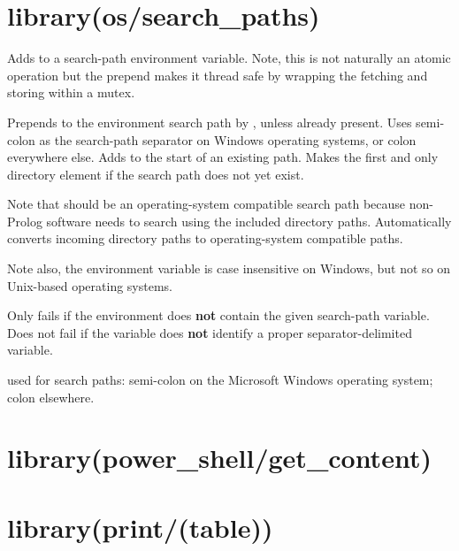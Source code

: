 \chapter{library(os/search_paths)}\label{sec:searchpaths}

\begin{description}
Adds  to a search-path environment variable. Note, this is
not naturally an atomic operation but the prepend makes it thread
safe by wrapping the fetching and storing within a mutex.

Prepends  to the environment search path by , unless
already present. Uses semi-colon as the search-path separator on
Windows operating systems, or colon everywhere else. Adds 
to the start of an existing path. Makes  the first and only
directory element if the search path does not yet exist.

Note that  should be an operating-system compatible search
path because non-Prolog software needs to search using the included
directory paths. Automatically converts incoming directory paths to
operating-system compatible paths.

Note also, the environment variable  is case insensitive on
Windows, but not so on Unix-based operating systems.

\nodescription
Only fails if the environment does \textbf{not} contain the given
search-path variable. Does not fail if the variable does \textbf{not}
identify a proper separator-delimited variable.

 used for search paths: semi-colon on the Microsoft Windows
operating system; colon elsewhere.
\end{description}

\chapter{library(power_shell/get_content)}\label{sec:getcontent}\chapter{library(print/(table))}\label{sec:table}

